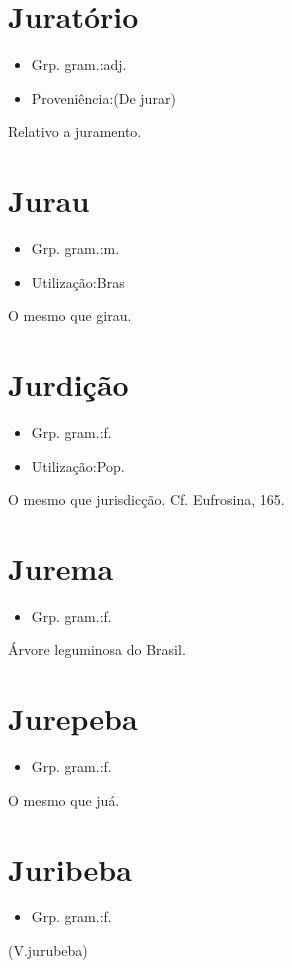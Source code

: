 \documentclass{article}
\begin{document}
\section{Juratório}
\begin{itemize}
\item {Grp. gram.:adj.}
\end{itemize}
\begin{itemize}
\item {Proveniência:(De \textunderscore jurar\textunderscore )}
\end{itemize}
Relativo a juramento.
\section{Jurau}
\begin{itemize}
\item {Grp. gram.:m.}
\end{itemize}
\begin{itemize}
\item {Utilização:Bras}
\end{itemize}
O mesmo que \textunderscore girau\textunderscore .
\section{Jurdição}
\begin{itemize}
\item {Grp. gram.:f.}
\end{itemize}
\begin{itemize}
\item {Utilização:Pop.}
\end{itemize}
O mesmo que \textunderscore jurisdicção\textunderscore . Cf. \textunderscore Eufrosina\textunderscore , 165.
\section{Jurema}
\begin{itemize}
\item {Grp. gram.:f.}
\end{itemize}
Árvore leguminosa do Brasil.
\section{Jurepeba}
\begin{itemize}
\item {Grp. gram.:f.}
\end{itemize}
O mesmo que \textunderscore juá\textunderscore .
\section{Juribeba}
\begin{itemize}
\item {Grp. gram.:f.}
\end{itemize}
(V.jurubeba)
\end{document}
